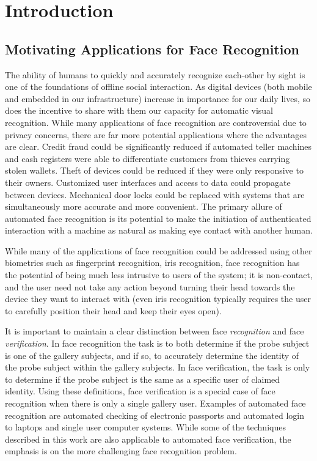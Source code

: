 \chapter{Introduction}
\label{chap:introduction}

\section{Motivating Applications for Face Recognition}
The ability of humans to quickly and accurately recognize each-other by sight
is one of the foundations of offline social interaction.  As digital devices
(both mobile and embedded in our infrastructure) increase in importance for our
daily lives, so does the incentive to share with them our capacity for
automatic visual recognition.  While many applications of face recognition are
controversial due to privacy concerns, there are far more potential
applications where the advantages are clear.  Credit fraud could be
significantly reduced if automated teller machines and cash registers were able
to differentiate customers from thieves carrying stolen wallets.  Theft of
devices could be reduced if they were only responsive to their owners.
Customized user interfaces and access to data could propagate between devices.
Mechanical door locks could be replaced with systems that are simultaneously
more accurate and more convenient.  The primary allure of
automated face recognition is its potential to make the initiation of
authenticated interaction with a machine as natural as making eye contact with
another human.

While many of the applications of face recognition could be addressed using
other biometrics such as fingerprint recognition, iris recognition, face
recognition has the potential of being much less intrusive to users of the
system; it is non-contact, and the user need not take any action beyond turning
their head towards the device they want to interact with (even iris recognition
typically requires the user to carefully position their head and keep their
eyes open).  

It is important to maintain a clear distinction between face {\em recognition}
and face {\em verification}.  In face recognition the task is to both determine
if the probe subject is one of the gallery subjects, and if so, to accurately
determine the identity of the probe subject within the gallery subjects.  In
face verification, the task is only to determine if the probe subject is the
same as a specific user of claimed identity.  Using these definitions, face
verification is a special case of face recognition when there is only a single
gallery user.  Examples of automated face recognition are automated checking of electronic
passports and automated login to laptops and single user computer systems.  While some
of the techniques described in this work are also applicable to automated face
verification, the emphasis is on the more challenging face recognition problem.

